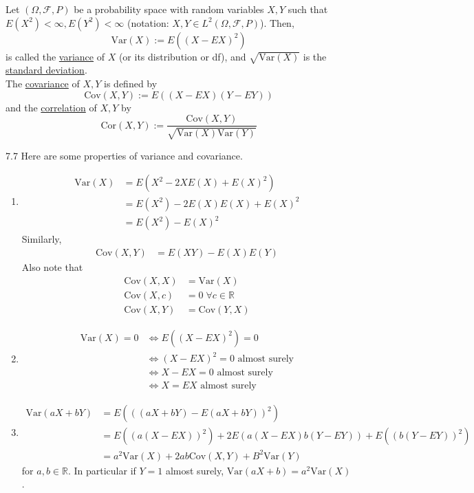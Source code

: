 \documentclass{article}
\newcommand{\R}{\mathbb{R}}
\newcommand{\Var}{\mathrm{Var}}
\newcommand{\Cov}{\mathrm{Cov}}
\newcommand{\Cor}{\text{Cor}}
\begin{document}
		\begin{mydef}{}{}
			Let $(\Omega, \mathcal{F}, P)$ be a probability space with random variables $X, Y$ such that $E(X^2)<\infty, E(Y^2)<\infty$ (notation: $X, Y\in L^2(\Omega, \mathcal{F}, P)$). Then, $$\Var(X):=E((X-EX)^2)$$ is called the \ul{variance} of $X$ (or its distribution or df), and $\sqrt{\Var(X)}$ is the \ul{standard deviation}.\\
			
			The \ul{covariance} of $X, Y$ is defined by $$\Cov(X, Y):=E((X-EX)(Y-EY))$$ and the \ul{correlation} of $X, Y$ by $$\Cor(X, Y):=\frac{\Cov(X, Y)}{\sqrt{\Var(X)\Var(Y)}}$$
		\end{mydef}
		
		\begin{myrem}{}{7.7}
			Here are some properties of variance and covariance.
			\begin{enumerate}
				\item
				\begin{align*}
					\Var(X)&=E(X^2-2XE(X)+E(X)^2)\\
					&=E(X^2)-2E(X)E(X)+E(X)^2\\
					&=E(X^2)-E(X)^2
				\end{align*}
				Similarly,
				\begin{align*}
					\Cov(X, Y)&=E(XY)-E(X)E(Y)
				\end{align*}
				Also note that
				\begin{align*}
					\Cov(X, X)&=\Var(X)\\
					\Cov(X, c)&=0\;\forall c\in\R\\
					\Cov(X, Y)&=\Cov(Y, X)
				\end{align*}
				
				\item
				\begin{align*}
					\Var(X)=0&\Leftrightarrow E((X-EX)^2)=0\\
					&\Leftrightarrow(X-EX)^2=0\mbox{ almost surely}\\
					&\Leftrightarrow X-EX=0\mbox{ almost surely}\\
					&\Leftrightarrow X=EX\mbox{ almost surely}
				\end{align*}
				
				\item
				\begin{align*}
					\Var(aX+bY)&=E(((aX+bY)-E(aX+bY))^2)\\
					&=E((a(X-EX))^2)+2E(a(X-EX)b(Y-EY))+E((b(Y-EY))^2)\\
					&=a^2\Var(X)+2ab\Cov(X, Y)+B^2\Var(Y)
				\end{align*}
				for $a, b\in\R$. In particular if $Y=1$ almost surely, $\Var(aX+b)=a^2\Var(X)$.
				

\end{enumerate}
\end{myrem}
\end{document}
